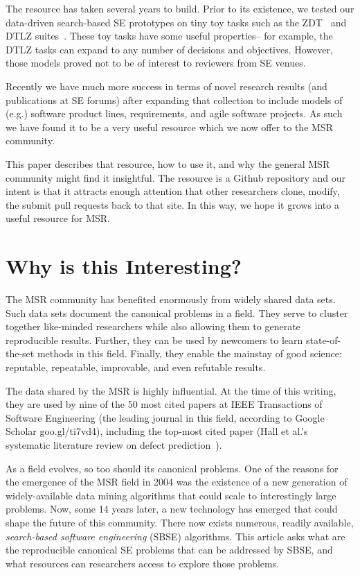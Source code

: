 \documentclass[table, xcdraw, sigconf,review, anonymous]{acmart}
\begin{document}
The resource has   taken several years to build. Prior to its
existence, we tested   our data-driven search-based SE
prototypes on tiny toy tasks such as the ZDT~\cite{xx} and DTLZ suites~\cite{xx}. These toy tasks have some useful
properties-- for example, the DTLZ tasks can expand to any number of decisions and objectives.
However, 
those models proved not to be of interest to reviewers from SE venues. 

Recently we have much more success in terms of novel research results
(and publications at SE forums) after 
expanding that collection
to include models
of (e.g.) software product lines, requirements, and
agile software projects. 
As such we have found it to be a very useful resource
which we now offer to the MSR community.

This paper describes that resource,    how to use it,
and why the general MSR community might find it insightful.
The resource is a Github repository and our intent is that it
attracts enough attention that  other researchers  clone, modify, the submit  pull requests back to that site. In this way, we hope it grows
into a useful resource for MSR.

\section{Why is this Interesting?}

The MSR  community has benefited enormously from widely shared data sets.  Such data sets document the canonical problems in a field.
They serve to cluster together like-minded researchers while also
  allowing   them to generate reproducible results. Further, they can be used by
   newcomers to learn state-of-the-set methods in this field. Finally, they enable the mainstay of good science:
reputable, repeatable,  improvable, and even refutable results.

The data shared by the MSR is highly influential.
At the time of this writing, they are used by nine of the 50 most cited papers at IEEE Transactions of Software Engineering (the leading journal in this field, according to Google Scholar  goo.gl/ti7vd4),
including the top-most cited paper (Hall et al.'s systematic literature review on defect prediction~\cite{hall12tse}).

As a field evolves, so too should its canonical problems. One of the reasons for the emergence of the MSR field in 2004 was the existence of a new generation of widely-available data mining
algorithms that could scale to interestingly large problems.  Now, some 14 years later, a new technology has emerged that could shape the future of this community. There now exists numerous, readily
available, {\em search-based software engineering} (SBSE) algorithms. This article asks what are the reproducible
canonical SE problems that can be addressed by SBSE, and what resources can researchers access to explore those problems.
\end{document}
